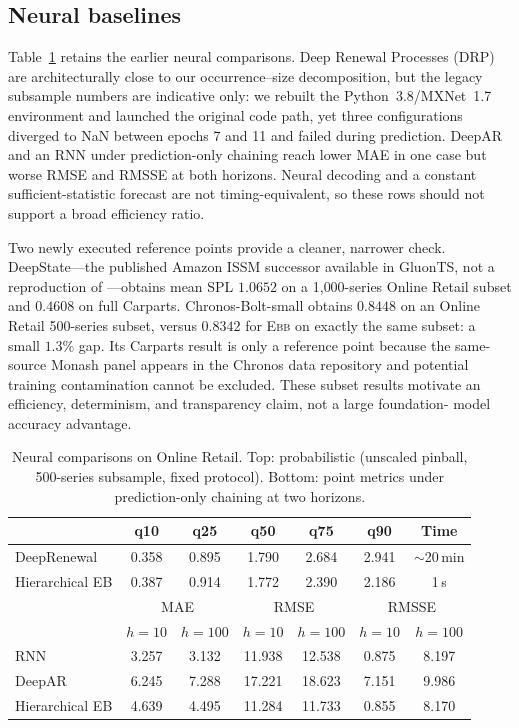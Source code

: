 \documentclass[twoside]{article}
\theoremstyle{definition}
\newcommand{\EBB}{\textsc{Ebb}}
\begin{document}
\subsection{Neural baselines}
\label{app:neural}

Table~\ref{tab:neural} retains the earlier neural comparisons. Deep
Renewal Processes (DRP) \citep{turkmen2019} are architecturally close to
our occurrence--size decomposition, but the legacy subsample numbers are
indicative only: we rebuilt the Python~3.8/MXNet~1.7 environment and
launched the original code path, yet three configurations diverged to
NaN between epochs 7 and 11 and failed during prediction. DeepAR and an
RNN under prediction-only chaining reach lower MAE in one case but worse
RMSE and RMSSE at both horizons. Neural decoding and a constant
sufficient-statistic forecast are not timing-equivalent, so these rows
should not support a broad efficiency ratio.

Two newly executed reference points provide a cleaner, narrower check.
DeepState---the published Amazon ISSM successor available in GluonTS,
not a reproduction of \citet{seeger2016}---obtains mean SPL $1.0652$ on
a 1{,}000-series Online Retail subset and $0.4608$ on full Carparts.
Chronos-Bolt-small obtains $0.8448$ on an Online Retail 500-series subset,
versus $0.8342$ for \EBB{} on exactly the same subset: a small $1.3\%$
gap. Its Carparts result is only a reference point because the same-source
Monash panel appears in the Chronos data repository and potential training
contamination cannot be excluded. These subset results motivate an
efficiency, determinism, and transparency claim, not a large foundation-
model accuracy advantage.

\begin{table}[t]
\centering
\caption{Neural comparisons on Online Retail. Top: probabilistic
(unscaled pinball, 500-series subsample, fixed protocol). Bottom: point
metrics under prediction-only chaining at two horizons.}
\label{tab:neural}
\small
\setlength{\tabcolsep}{4pt}
\begin{tabular}{lcccccc}
\toprule
 & q10 & q25 & q50 & q75 & q90 & Time\\
\midrule
DeepRenewal & 0.358 & 0.895 & 1.790 & 2.684 & 2.941 & $\sim$20\,min\\
Hierarchical EB & 0.387 & 0.914 & 1.772 & 2.390 & 2.186 & 1\,s\\
\midrule
 & \multicolumn{2}{c}{MAE} & \multicolumn{2}{c}{RMSE} & \multicolumn{2}{c}{RMSSE}\\
 & $h{=}10$ & $h{=}100$ & $h{=}10$ & $h{=}100$ & $h{=}10$ & $h{=}100$\\
\midrule
RNN & 3.257 & 3.132 & 11.938 & 12.538 & 0.875 & 8.197\\
DeepAR & 6.245 & 7.288 & 17.221 & 18.623 & 7.151 & 9.986\\
Hierarchical EB & 4.639 & 4.495 & 11.284 & 11.733 & 0.855 & 8.170\\
\bottomrule
\end{tabular}
\end{table}
\end{document}
